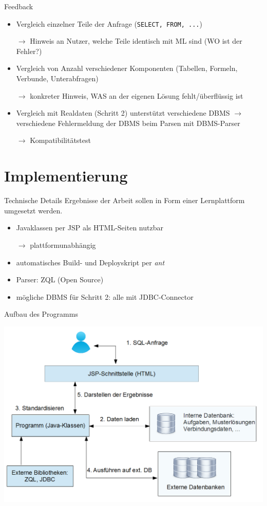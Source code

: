 \documentclass{beamer}
\begin{document}
\begin{frame}[fragile]{Feedback}
\begin{itemize}
\item Vergleich einzelner Teile der Anfrage (\verb|SELECT, FROM, ...|)
\item[$\to$] Hinweis an Nutzer, welche Teile identisch mit ML sind (WO ist der Fehler?)
\item Vergleich von Anzahl verschiedener Komponenten (Tabellen, Formeln, Verbunde, Unterabfragen)
\item[$\to$] konkreter Hinweis, WAS an der eigenen Lösung fehlt/überflüssig ist
\item Vergleich mit Realdaten (Schritt 2) unterstützt verschiedene DBMS $\to$ verschiedene Fehlermeldung der DBMS beim Parsen mit DBMS-Parser
\item[$\to$] Kompatibilitätstest 
\end{itemize}
\end{frame}


\section{Implementierung}


\begin{frame}[fragile]{Technische Details}
Ergebnisse der Arbeit sollen in Form einer Lernplattform umgesetzt werden.
\vspace{5mm}
\begin{itemize}
\item Javaklassen per JSP als HTML-Seiten nutzbar
\item[$\to$] plattformunabhängig
\item automatisches Build- und Deployskript per \textit{ant}
\item Parser: ZQL (Open Source)
\item mögliche DBMS für Schritt 2: alle mit JDBC-Connector 
\end{itemize}
\end{frame}

\begin{frame}[fragile]{Aufbau des Programms}
\begin{center}
\includegraphics[scale=0.4]{schema.png}
\end{center}
\end{frame}
\end{document}
